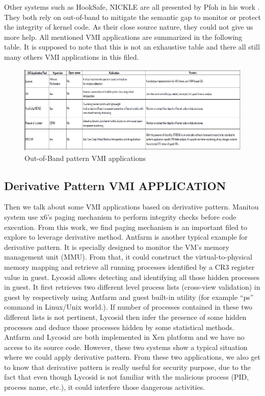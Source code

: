 Other systems such as HookSafe, NICKLE are all presented by Pfoh in his work  \cite{Reference7}. They both rely on out-of-band to mitigate the 
semantic gap to monitor or protect the integrity of kernel code. As their close source nature, they could not give us more help. All mentioned 
VMI applications are summarized in the following table. It is supposed to note that this is not an exhaustive table and there all still many 
others VMI applications in this filed.

\begin{figure}[htbp]
	\centering
		\includegraphics[scale=1]{Figures/Figure1.pdf}
	\caption[Out-of-Band pattern VMI applications]{Out-of-Band pattern VMI applications}
	\label{fig:Out-of-Band pattern VMI applications}
\end{figure}


\subsection{Derivative Pattern VMI APPLICATION}
Then we talk about some VMI applications based on derivative pattern. Manitou system use x6’s paging mechanism to perform integrity checks 
before code execution. From this work, we find paging mechanism is an important filed to explore to leverage derivative method. Antfarm is 
another typical example for derivative pattern. It is specially designed to monitor the VM’s memory management unit (MMU). From that, it could
construct the virtual-to-physical memory mapping and retrieve all running processes identified by a CR3 register value in guest. Lycosid allows
detecting and identifying all those hidden processes in guest. It first retrieves two different level process lists (cross-view validation) in 
guest by respectively using Antfarm and guest built-in utility (for example “ps” command in Linux/Unix world.). If number of processes contained
in these two different lists is not pertinent, Lycosid then infer the presence of some hidden processes and deduce those processes hidden by 
some statistical methods. Antfarm and Lycosid are both implemented in Xen platform and we have no access to its source code. However, these two
systems show a typical situation where we could apply derivative pattern. From these two applications, we also get to know that derivative 
pattern is really useful for security purpose, due to the fact that even though Lycosid is not familiar with the malicious process (PID, 
process name, etc.), it could interfere those dangerous activities.

